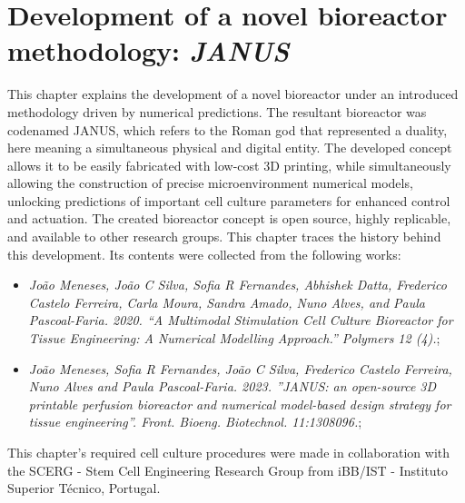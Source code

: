 %
%


\newpage
\chapter{Development of a novel bioreactor methodology: \textit{JANUS}}
This chapter explains the development of a novel bioreactor under an introduced methodology driven by numerical predictions. The resultant bioreactor was codenamed JANUS, which refers to the Roman god that represented a duality, here meaning a simultaneous physical and digital entity. The developed concept allows it to be easily fabricated with low-cost 3D printing, while simultaneously allowing the construction of precise microenvironment numerical models, unlocking predictions of important cell culture parameters for enhanced control and actuation. The created bioreactor concept is open source, highly replicable, and available to other research groups. This chapter traces the history behind this development. Its contents were collected from the following works:
\begin{itemize}
\item \small \textit{João Meneses, João C Silva, Sofia R Fernandes, Abhishek Datta, Frederico Castelo Ferreira, Carla Moura, Sandra Amado, Nuno Alves, and Paula Pascoal-Faria. 2020. “A Multimodal Stimulation Cell Culture Bioreactor for Tissue Engineering: A Numerical Modelling Approach.” Polymers 12 (4).};
\item \small \textit{João Meneses, Sofia R Fernandes, João C Silva, Frederico Castelo Ferreira, Nuno Alves and Paula Pascoal-Faria. 2023. ''JANUS: an open-source 3D printable perfusion bioreactor and numerical model-based design strategy for tissue engineering''. Front. Bioeng. Biotechnol. 11:1308096.};
\end{itemize}
This chapter's required cell culture procedures were made in collaboration with the SCERG - Stem Cell Engineering Research Group from iBB/IST - Instituto Superior Técnico, Portugal.
\newpage 





